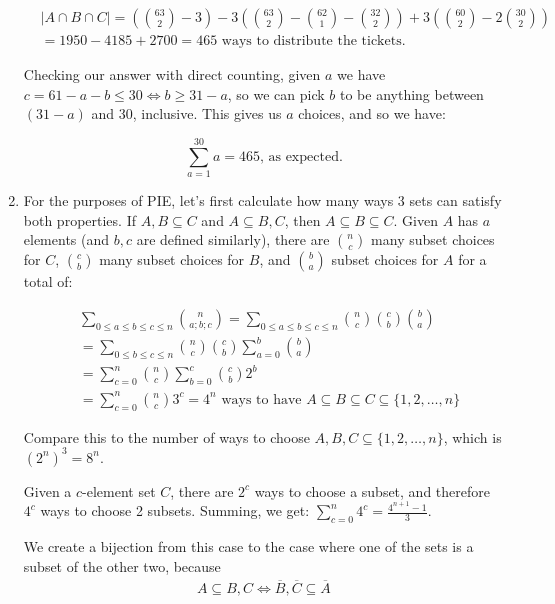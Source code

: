 \documentclass{book}
\numberwithin{equation}{section}
\begin{document}
\begin{enumerate}[label={6.\arabic*}]
\begin{align*}
& |A \cap B \cap C| = ({63 \choose 2} - 3) - 3({63 \choose 2} - {62 \choose 1} - {32 \choose 2}) + 3({60 \choose 2} - 2{30 \choose 2}) \\
& = 1950 - 4185 + 2700 = 465 \text{ ways to distribute the tickets.}
\end{align*}

Checking our answer with direct counting, given $a$ we have $c = 61 - a - b \leq 30 \iff b \geq 31 - a$, so we can pick
$b$ to be anything between $(31-a)$ and 30, inclusive. This gives us $a$ choices, and so we have:

$$ \sum_{a=1}^{30} a = 465 \text{, as expected.}$$

\item
For the purposes of PIE, let's first calculate how many ways 3 sets can satisfy both properties. If $A, B \subseteq C$
and $A \subseteq B, C$, then $A \subseteq B \subseteq C$. Given $A$ has $a$ elements (and $b, c$ are defined
similarly), there are ${n \choose c}$ many subset choices for $C$, ${c \choose b}$ many subset choices
for $B$, and ${b \choose a}$ subset choices for $A$ for a total of:

\begin{align*}
& \sum_{0 \leq a \leq b \leq c \leq n} {n \choose a;b;c} = \sum_{0 \leq a \leq b \leq c \leq n} {n \choose c}{c \choose b}{b \choose a} \\
& = \sum_{0 \leq b \leq c \leq n}{n \choose c}{c \choose b}\sum_{a=0}^b {b \choose a} \\
& = \sum_{c=0}^n{n \choose c}\sum_{b=0}^c{c \choose b}2^b \\
& = \sum_{c=0}^n{n \choose c}3^c = 4^n \text{ ways to have } A \subseteq B \subseteq C \subseteq \{1, 2, \ldots, n \}
\end{align*}

Compare this to the number of ways to choose $A, B, C \subseteq \{1, 2, \ldots, n \}$, which is $(2^n)^3 = 8^n$.

Given a $c$-element set $C$, there are $2^c$ ways to choose a subset, and therefore $4^c$ ways to choose 2 subsets.
Summing, we get: $\sum_{c=0}^n 4^c = \frac{4^{n+1} - 1}{3}$.

We create a bijection from this case to the case where one of the sets is a subset of the other two, because
\begin{align*}
A \subseteq B, C \iff \overline{B}, \overline{C} \subseteq \overline{A}
\end{align*}


\end{enumerate}
\end{document}
